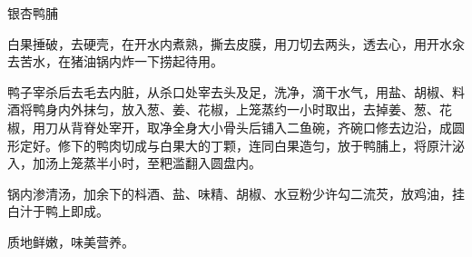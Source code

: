 \begin{recipe}{银杏鸭脯}

\ingredients



\cooking

\step 白果捶破，去硬壳，在开水内煮熟，撕去皮膜，用刀切去两头，透去心，用开水汆去苦水，在猪油锅内炸一下捞起待用。

\step 鸭子宰杀后去毛去内脏，从杀口处宰去头及足，洗净，滴干水气，用盐、胡椒、料酒将鸭身内外抹匀，放入葱、姜、花椒，上笼蒸约一小时取出，去掉姜、葱、花椒，用刀从背脊处宰开，取净全身大小骨头后铺入二鱼碗，齐碗口修去边沿，成圆形定好。修下的鸭肉切成与白果大的丁颗，连同白果造匀，放于鸭脯上，将原汁泌入，加汤上笼蒸半小时，至粑滥翻入圆盘内。

\step 锅内渗清汤，加余下的枓酒、盐、味精、胡椒、水豆粉少许勾二流芡，放鸡油，挂白汁于鸭上即成。

\notes

质地鲜嫩，味美营养。

\end{recipe}

